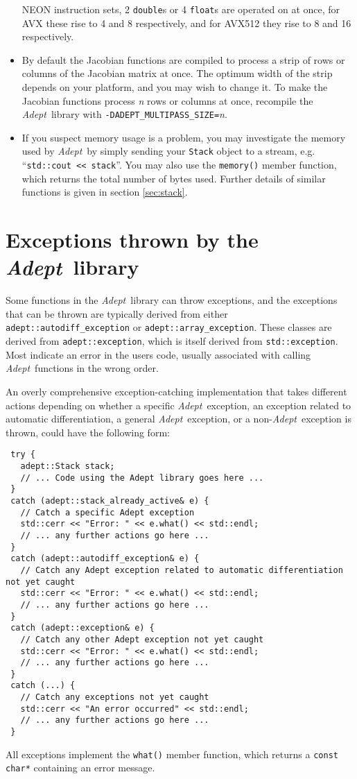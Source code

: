 \documentclass[a4,oneside]{book}
\def\codesize{\small}
\def\Adept{\emph{Adept}}
\def\code#1{{\codesize\texttt{#1}}}
\begin{document}
\begin{itemize}
  NEON instruction sets, 2 \code{double}s or 4 \code{float}s are
  operated on at once, for AVX these rise to 4 and 8 respectively, and
  for AVX512 they rise to 8 and 16 respectively.
\item By default the Jacobian functions are compiled to process a
  strip of rows or columns of the Jacobian matrix at once. The optimum
  width of the strip depends on your platform, and you may wish to
  change it. To make the Jacobian functions process \textit{n} rows or
  columns at once, recompile the \Adept\ library with
  \code{-DADEPT\_MULTIPASS\_SIZE=}\textit{n}.
\item If you suspect memory usage is a problem, you may investigate
  the memory used by \Adept\ by simply sending your \code{Stack} object to a
  stream, e.g. ``\code{std::cout \textless\textless\ stack}''. You may
  also use the \code{memory()} member function, which returns the
  total number of bytes used. Further details of similar functions is
  given in section \ref{sec:stack}.
\end{itemize}

\section{Exceptions thrown by the \Adept\ library}
\label{sec:exceptions}
Some functions in the \Adept\ library can throw exceptions, and the
exceptions that can be thrown are typically derived from either
\code{adept::autodiff\_exception} or
\code{adept::array\_exception}. These classes are derived from
\code{adept::exception}, which is itself derived from
\code{std::exception}. Most indicate an error in the users code,
usually associated with calling \Adept\ functions in the wrong order.

An overly comprehensive exception-catching implementation that takes
different actions depending on whether a specific \Adept\ exception,
an exception related to automatic differentiation, a general
\Adept\ exception, or a non-\Adept\ exception is thrown, could have
the following form:
%
\begin{lstlisting}
 try {
   adept::Stack stack;
   // ... Code using the Adept library goes here ...
 }
 catch (adept::stack_already_active& e) {
   // Catch a specific Adept exception
   std::cerr << "Error: " << e.what() << std::endl;
   // ... any further actions go here ...
 }
 catch (adept::autodiff_exception& e) {
   // Catch any Adept exception related to automatic differentiation not yet caught
   std::cerr << "Error: " << e.what() << std::endl;
   // ... any further actions go here ...
 }
 catch (adept::exception& e) {
   // Catch any other Adept exception not yet caught
   std::cerr << "Error: " << e.what() << std::endl;
   // ... any further actions go here ...
 }
 catch (...) {
   // Catch any exceptions not yet caught
   std::cerr << "An error occurred" << std::endl;
   // ... any further actions go here ...
 }
\end{lstlisting}
%
All exceptions implement the \code{what()} member function, which
returns a \code{const char*} containing an error message. 
\end{document}
